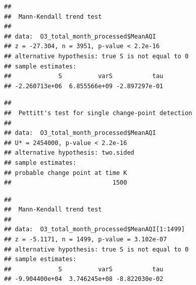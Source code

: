 \documentclass[12pt,]{article}
\newenvironment{Shaded}{\begin{snugshade}}{\end{snugshade}}
\newcommand{\KeywordTok}[1]{\textcolor[rgb]{0.13,0.29,0.53}{\textbf{#1}}}
\newcommand{\DecValTok}[1]{\textcolor[rgb]{0.00,0.00,0.81}{#1}}
\newcommand{\CommentTok}[1]{\textcolor[rgb]{0.56,0.35,0.01}{\textit{#1}}}
\newcommand{\OperatorTok}[1]{\textcolor[rgb]{0.81,0.36,0.00}{\textbf{#1}}}
\newcommand{\NormalTok}[1]{#1}
\begin{document}
\begin{Shaded}
\end{Shaded}

\begin{verbatim}
## 
##  Mann-Kendall trend test
## 
## data:  O3_total_month_processed$MeanAQI
## z = -27.304, n = 3951, p-value < 2.2e-16
## alternative hypothesis: true S is not equal to 0
## sample estimates:
##             S          varS           tau 
## -2.260713e+06  6.855566e+09 -2.897297e-01
\end{verbatim}

\begin{Shaded}
\end{Shaded}

\begin{verbatim}
## 
##  Pettitt's test for single change-point detection
## 
## data:  O3_total_month_processed$MeanAQI
## U* = 2454000, p-value < 2.2e-16
## alternative hypothesis: two.sided
## sample estimates:
## probable change point at time K 
##                            1500
\end{verbatim}

\begin{Shaded}
\end{Shaded}

\begin{verbatim}
## 
##  Mann-Kendall trend test
## 
## data:  O3_total_month_processed$MeanAQI[1:1499]
## z = -5.1171, n = 1499, p-value = 3.102e-07
## alternative hypothesis: true S is not equal to 0
## sample estimates:
##             S          varS           tau 
## -9.904400e+04  3.746245e+08 -8.822030e-02
\end{verbatim}

\begin{Shaded}
\end{Shaded}
\end{document}
